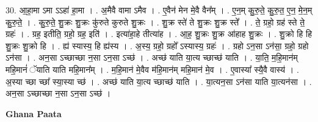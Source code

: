 \documentclass[17pt]{extarticle}
\begin{document}
30. आ॒हा॒मा ऽमा ऽऽहा॑ हा॒मा । . अ॒मैवै वामा ऽमैव । . ए॒वैन॑ मेन मे॒वै वैन᳚म् । . ए॒न॒म् कु॒रु॒ते॒ कु॒रु॒त॒ ए॒न॒ मे॒न॒म् कु॒रु॒ते॒ । . कु॒रु॒ते॒ शु॒क्रः शु॒क्रः कु॑रुते कुरुते शु॒क्रः । . शु॒क्र स्ते॑ ते शु॒क्रः शु॒क्र स्ते᳚ । . ते॒ ग्रहो॒ ग्रह॑ स्ते ते॒ ग्रहः॑ । . ग्रह॒ इतीति॒ ग्रहो॒ ग्रह॒ इति॑ । . इत्या॑हा॒हे तीत्या॑ह । . आ॒ह॒ शु॒क्रः शु॒क्र आ॑हाह शु॒क्रः । . शु॒क्रो हि हि शु॒क्रः शु॒क्रो हि । . ह्य॑ स्यास्य॒ हि ह्य॑स्य । . अ॒स्य॒ ग्रहो॒ ग्रहो᳚ ऽस्यास्य॒ ग्रहः॑ । . ग्रहो ऽन॒सा ऽन॑सा॒ ग्रहो॒ ग्रहो ऽन॑सा । . अन॒सा ऽच्छाच्छा न॒सा ऽन॒सा ऽच्छ॑ । . अच्छ॑ याति या॒त्य च्छाच्छ॑ याति । . या॒ति॒ म॒हि॒मान॑म् महि॒मानं॑ ॅयाति याति महि॒मान᳚म् । . म॒हि॒मान॑ मे॒वैव म॑हि॒मान॑म् महि॒मान॑ मे॒व । . ए॒वास्या᳚ स्यै॒वै वास्य॑ । . अ॒स्या च्छा च्छा᳚ स्या॒स्या च्छ॑ । . अच्छ॑ याति या॒त्य च्छाच्छ॑ याति । . या॒त्यन॒सा ऽन॑सा याति या॒त्यन॑सा । . अन॒सा ऽच्छाच्छा न॒सा ऽन॒सा ऽच्छ॑ । \newline

\textbf{Ghana Paata } \newline
\end{document}
